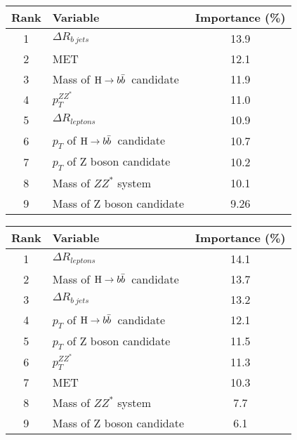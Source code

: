 \noindent\begin{table}[H]
\centering
\begin{tabular}{|c| l |c|}\hline
Rank & Variable & Importance (\%) \\\hline
1 & $\Delta R_{b\ jets}$ & 13.9 \\ 
2 & MET & 12.1 \\ 
3 & Mass of $\mathrm{H}\to b\bar{b}$~candidate & 11.9 \\ 
4 & $p_T^{ZZ^*}$ & 11.0 \\ 
5 & $\Delta R_{leptons}$ & 10.9 \\ 
6 & $p_T$ of $\mathrm{H}\to b\bar{b}$~candidate & 10.7 \\ 
7 & $p_T$ of Z boson candidate & 10.2 \\ 
8 & Mass of $ZZ^*$ system & 10.1 \\ 
9 & Mass of Z boson candidate & 9.26 \\ 
\hline
\end{tabular}
\label{tab:importance_ee_low}
\end{table}
\begin{table}
\centering
\begin{tabular}{|c| l |c|}\hline
Rank & Variable & Importance (\%) \\\hline
1 & $\Delta R_{leptons}$ & 14.1 \\ 
2 & Mass of $\mathrm{H}\to b\bar{b}$~candidate & 13.7 \\ 
3 & $\Delta R_{b\ jets}$ & 13.2 \\ 
4 & $p_T$ of $\mathrm{H}\to b\bar{b}$~candidate & 12.1 \\ 
5 & $p_T$ of Z boson candidate & 11.5 \\ 
6 & $p_T^{ZZ^*}$ & 11.3 \\ 
7 & MET & 10.3 \\ 
8 & Mass of $ZZ^*$ system & 7.7 \\ 
9 & Mass of Z boson candidate & 6.1 \\ 
\hline
\end{tabular}
\label{tab:importance_ee_high}
\end{table}

